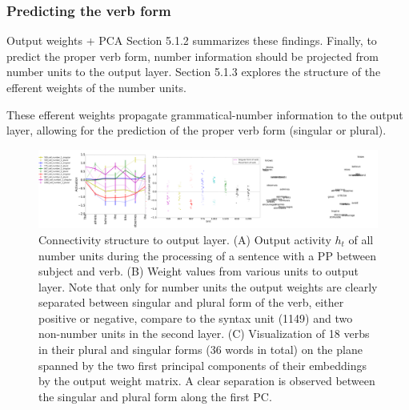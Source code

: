 \subsubsection{Predicting the verb form}
Output weights + PCA
Section 5.1.2 summarizes these findings. Finally, to predict the proper verb form, number information should be projected from number units to the output layer. Section 5.1.3 explores the structure of the efferent weights of the number units. 

These efferent weights propagate grammatical-number information to the output layer, allowing for the prediction of the proper verb form (singular or plural). 

\begin{figure}[t]
\centering
\includegraphics[width=\textwidth]{Figures/Figure4_output_weights.png}
\caption{Connectivity structure to output layer. (A) Output activity $h_t$ of all number units during the processing of a sentence with a PP between subject and verb. (B) Weight values from various units to output layer. Note that only for number units the output weights are clearly separated between singular and plural form of the verb, either positive or negative, compare to the syntax unit (1149) and two non-number units in the second layer. (C) Visualization of 18 verbs in their plural and singular forms (36 words in total) on the plane spanned by the two first principal components of their embeddings by the output weight matrix. A clear separation is observed between the singular and plural form along the first PC.}
\end{figure}


